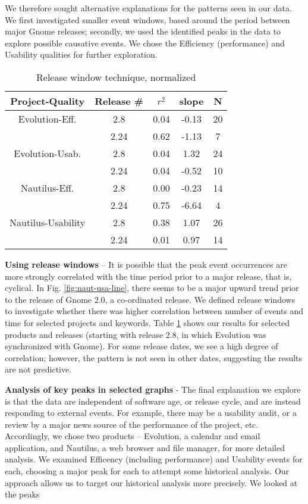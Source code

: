 \documentclass[conference, compsoc]{IEEEtran}
\begin{document}
We therefore sought alternative explanations for the patterns seen in our data. We first investigated smaller event windows, based around the period between major Gnome releases; secondly, we used the identified peaks in the data to explore possible causative events. We chose the Efficiency (performance) and Usability qualities for further exploration.

\begin{table}
	\caption{Release window technique, normalized}
	\centering
	\label{tbl:windows}
\begin{tabular}{|c|c|c|c|c|}
\hline
\rowcolor[gray]{.9} 
Project-Quality & Release \# & $r^2$ & slope & N\\ \hline
Evolution-Eff. & 2.8 & 0.04 & -0.13 & 20 \\
 & 2.24 & 0.62 & -1.13 & 7\\ \hline
Evolution-Usab. & 2.8 & 0.04 & 1.32 & 24\\
 & 2.24 & 0.04 & -0.52 & 10 \\ \hline
Nautilus-Eff. & 2.8 & 0.00 & -0.23 & 14 \\
 & 2.24 & 0.75 & -6.64 & 4 \\ \hline
Nautilus-Usability & 2.8 & 0.38 & 1.07 & 26\\
 & 2.24 & 0.01 & 0.97 & 14\\
\hline
\end{tabular}
\end{table}

\noindent\textbf{Using release windows} -- It is possible that the peak event occurrences are more strongly correlated with the time period prior to a major release, that is, cyclical. In Fig. \ref{fig:naut-usa-line}, there seems to be a major upward trend prior to the release of Gnome 2.0, a co-ordinated release. We defined release windows to investigate whether there was higher correlation between number of events and time for selected projects and keywords. Table \ref{tbl:windows} shows our results for selected products and releases (starting with release 2.8, in which Evolution was synchronized with Gnome). For some release dates, we see a high degree of correlation; however, the pattern is not seen in other dates, suggesting the results are not predictive. 

\noindent\textbf{Analysis of key peaks in selected graphs} - The final explanation we explore is that the data are independent of software age, or release cycle, and are instead responding to external events. For example, there may be a usability audit, or a review by a major news source of the performance of the project, etc. Accordingly, we chose two products -- Evolution, a calendar and email application, and Nautilus, a web browser and file manager, for more detailed analysis. We examined Efficency (including performance) and Usability events for each, choosing a major peak for each to attempt some historical analysis. Our approach allows us to target our historical analysis more precisely. We looked at the peaks
\end{document}
